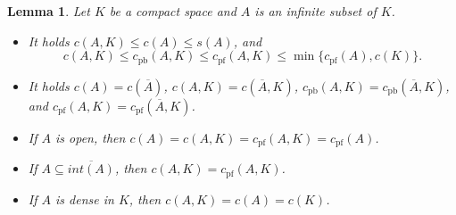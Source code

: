 \documentclass{amsart}
\numberwithin{equation}{section}
\newtheorem{lemma}[thm]{Lemma}
\theoremstyle{definition}
\begin{document}
\begin{lemma}
\label{rovnost_c=c_pf}
Let $K$ be a compact space and $A$ is an infinite subset of $K$.
\begin{itemize}
    \item[(i)] It holds $c(A, K) \leq c(A) \leq s(A)$, and
    \[c(A, K) \leq c_{\text{pb}}(A, K) \leq c_{\text{pf}}(A, K) \leq \min \{c_{\text{pf}}(A), c(K)\}.\]
    \item[(ii)] It holds $c(A)=c(\overline{A})$, $c(A, K)=c(\overline{A}, K)$, $c_{\text{pb}}(A, K)=c_{\text{pb}}(\overline{A}, K)$, and $c_{\text{pf}}(A, K)=c_{\text{pf}}(\overline{A}, K)$.
    \item[(iii)] If $A$ is open, then $c(A)=c(A, K)=c_{\text{pf}}(A, K)=c_{\text{pf}}(A)$.
    \item[(iv)] If $A \subseteq \overline{int(A)}$, then $c(A, K)=c_{\text{pf}}(A, K)$.
    \item[(v)] If $A$ is dense in $K$, then $c(A, K)=c(A)=c(K)$.
\end{itemize}
\end{lemma}
\end{document}
